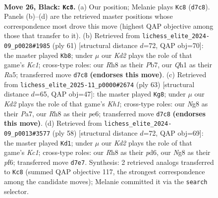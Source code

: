 \documentclass[11pt]{article}
\begin{document}
\clearpage

\begin{figure}[p]\centering
\begin{subfigure}{0.46\textwidth}\centering
\resizebox{\linewidth}{!}{%
\newchessgame
\chessboard[
  setfen={6nr/2rk2p1/8/1Qp3Pp/5P1P/2P5/PP3K2/RNB4q b - - 2 26},
  showmover=false,
  pgfstyle=straightmove, color=movearrow, markmove={d7-c8}
]}
\caption{}
\end{subfigure}\hfill
\begin{subfigure}{0.46\textwidth}\centering
\resizebox{\linewidth}{!}{%
\newchessgame
\chessboard[
  setfen={r1k5/1p6/4Qp2/r3pP2/4P3/1PP5/1P3qPP/1K2R3 b - - 2 31},
  showmover=false,
  pgfstyle=straightmove, color=movearrow, markmove={c8-b8}
]}
\caption{}
\end{subfigure}
\\[4pt]
\begin{subfigure}{0.46\textwidth}\centering
\resizebox{\linewidth}{!}{%
\newchessgame
\chessboard[
  setfen={3r3k/ppp3p1/4P3/4P2Q/5q2/4R2P/PP1r2P1/2N3K1 b - - 1 32},
  showmover=false,
  pgfstyle=straightmove, color=movearrow, markmove={h8-g8}
]}
\caption{}
\end{subfigure}\hfill
\begin{subfigure}{0.46\textwidth}\centering
\resizebox{\linewidth}{!}{%
\newchessgame
\chessboard[
  setfen={8/4prk1/p2p1p2/1p3PpQ/8/q5P1/P1P5/2K4R w - - 2 30},
  showmover=false,
  pgfstyle=straightmove, color=movearrow, markmove={c1-d1}
]}
\caption{}
\end{subfigure}
\caption{\textbf{Move 26, Black: \texttt{Kc8}.} (a) Our position; Melanie plays \texttt{Kc8} (\texttt{d7c8}). Panels (b)--(d) are the retrieved master positions whose correspondence most drove this move (highest QAP objective among those that transfer to it). (b) Retrieved from \texttt{lichess\_elite\_2024-09\_p0028\#1985} (ply 61) [structural distance $d$=72, QAP obj=70]: the master played \texttt{Kb8}; under $\mu$ our \emph{Kd2} plays the role of that game's \emph{Kc1}; cross-type roles: our \emph{R}h8 as their \emph{P}b7, our \emph{Q}h1 as their \emph{R}a5; transferred move \texttt{d7c8} \textbf{(endorses this move)}. (c) Retrieved from \texttt{lichess\_elite\_2025-11\_p0000\#2674} (ply 63) [structural distance $d$=65, QAP obj=47]: the master played \texttt{Kg8}; under $\mu$ our \emph{Kd2} plays the role of that game's \emph{Kh1}; cross-type roles: our \emph{N}g8 as their \emph{P}a7, our \emph{R}h8 as their \emph{p}e6; transferred move \texttt{d7c8} \textbf{(endorses this move)}. (d) Retrieved from \texttt{lichess\_elite\_2024-09\_p0013\#3577} (ply 58) [structural distance $d$=72, QAP obj=69]: the master played \texttt{Kd1}; under $\mu$ our \emph{Kd2} plays the role of that game's \emph{Kc1}; cross-type roles: our \emph{R}h8 as their \emph{p}d6, our \emph{N}g8 as their \emph{p}f6; transferred move \texttt{d7e7}. Synthesis: 2 retrieved analogs transferred to \texttt{Kc8} (summed QAP objective 117, the strongest correspondence among the candidate moves); Melanie committed it via the \texttt{search} selector.}
\label{fig:thought-m51}
\end{figure}
\end{document}
